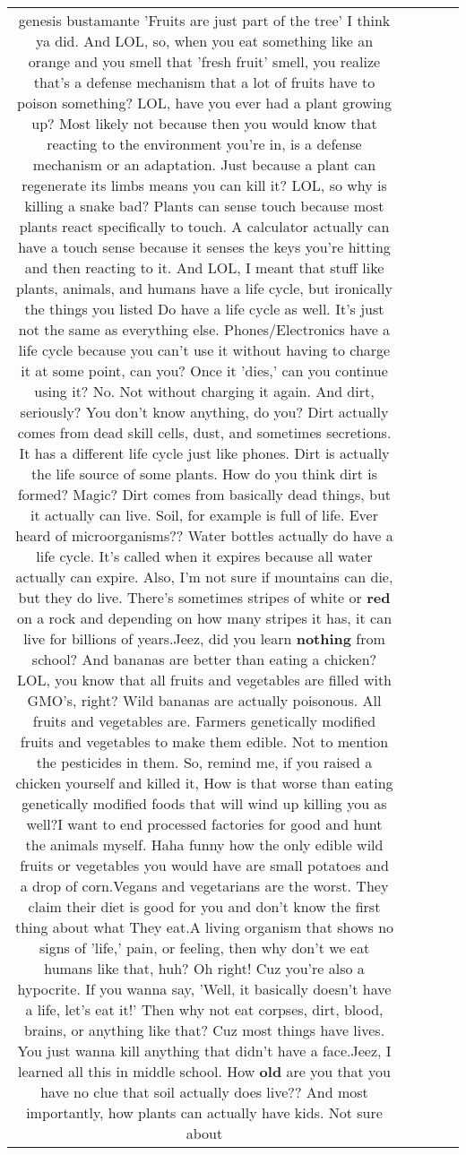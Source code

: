 \documentclass[11pt]{article}
\newlength\mylength
\begin{document}
\begin{center}
\begin{longtable}{|C{.65\mylength}|C{.30\mylength}|C{.12\mylength}|C{.12\mylength}|C{.12\mylength}|}
  \small genesis bustamante 'Fruits are just part of the tree' I think ya did. And LOL, so, when you eat something like an orange and you smell that 'fresh fruit' smell, you realize that's a defense mechanism that a lot of fruits have to poison something? LOL, have you ever had a plant growing up? Most likely not because then you would know that reacting to the environment you're in, is a defense mechanism or an adaptation. Just because a plant can regenerate its limbs means you can kill it? LOL, so why is killing a snake bad? Plants can sense touch because most plants react specifically to touch. A calculator actually can have a touch sense because it senses the keys you're hitting and then reacting to it. And LOL, I meant that stuff like plants, animals, and humans have a life cycle, but ironically the things you listed Do have a life cycle as well. It's just not the same as everything else. Phones/Electronics have a life cycle because you can't use it without having to charge it at some point, can you? Once it 'dies,' can you continue using it? No. Not without charging it again. And dirt, seriously? You don't know anything, do you? Dirt actually comes from dead skill cells, dust, and sometimes secretions. It has a different life cycle just like phones. Dirt is actually the life source of some plants. How do you think dirt is formed? Magic? Dirt comes from basically dead things, but it actually can live. Soil, for example is full of life. Ever heard of microorganisms?? Water bottles actually do have a life cycle. It's called when it expires because all water actually can expire. Also, I'm not sure if mountains can die, but they do live. There's sometimes stripes of white or \textbf{r\textbf{ed}} on a rock and depending on how many stripes it has, it can live for billions of years.Jeez, did you learn \textbf{nothing} from school? And bananas are better than eating a chicken? LOL, you know that all fruits and vegetables are filled with GMO's, right? Wild bananas are actually poisonous. All fruits and vegetables are. Farmers genetically modified fruits and vegetables to make them edible. Not to mention the pesticides in them. So, remind me, if you raised a chicken yourself and killed it, How is that worse than eating genetically modified foods that will wind up killing you as well?I want to end processed factories for good and hunt the animals myself. Haha funny how the only edible wild fruits or vegetables you would have are small potatoes and a drop of corn.Vegans and vegetarians are the worst. They claim their diet is good for you and don't know the first thing about what They eat.A living organism that shows no signs of 'life,' pain, or feeling, then why don't we eat humans like that, huh? Oh right! Cuz you're also a hypocrite. If you wanna say, 'Well, it basically doesn't have a life, let's eat it!' Then why not eat corpses, dirt, blood, brains, or anything like that? Cuz most things have lives. You just wanna kill anything that didn't have a face.Jeez, I learned all this in middle school. How \textbf{old} are you that you have no clue that soil actually does live?? And most importantly, how plants can actually have kids. Not sure about 
\end{longtable}
\end{center}
\end{document}
